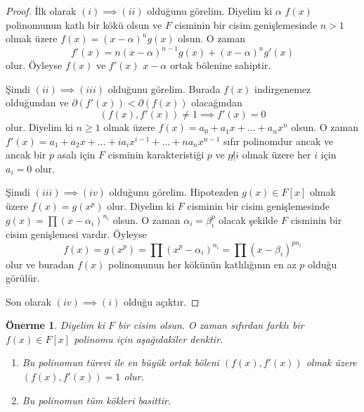 \documentclass[draft]{article}
\newtheorem{prop}[thm]{Önerme}
\theoremstyle{definition}
\theoremstyle{remark}
\begin{document}
    	    \begin{proof}
    	        İlk olarak $(i) \implies (ii)$ olduğunu görelim. Diyelim ki $\alpha$ $f(x)$ polinomunun katlı bir kökü olsun ve $F$ cisminin bir cisim genişlemesinde $n > 1$ olmak üzere $f(x) = (x - \alpha)^ng(x)$ olsun. O zaman
    	        \begin{equation*}
    	            f'(x) = n(x - \alpha)^{n - 1}g(x) + (x - \alpha)^ng'(x)
    	        \end{equation*}
    	        olur. Öyleyse $f(x)$ ve $f'(x)$ $x - \alpha$ ortak bölenine sahiptir.\par
    	        Şimdi $(ii) \implies (iii)$ olduğunu görelim. Burada $f(x)$ indirgenemez olduğundan ve $\partial(f'(x)) < \partial(f(x))$ olacağından
    	        \begin{equation*}
    	            (f(x), f'(x)) \neq 1 \implies f'(x) = 0
    	        \end{equation*}
    	        olur. Diyelim ki $n \geq 1$ olmak üzere $f(x) = a_0 + a_1x + \dots + a_nx^n$ olsun. O zaman $f'(x) = a_1 + a_2x + \dots + ia_ix^{i - 1} + \dots + na_nx^{n - 1}$ sıfır polinomdur ancak ve ancak bir $p$ asalı için $F$ cisminin karakteristiği $p$ ve $p \not| i$ olmak üzere her $i$ için $a_i = 0$ olur.\par
    	        Şimdi $(iii) \implies (iv)$ olduğunu görelim. Hipotezden $g(x) \in F[x]$ olmak üzere $f(x) = g(x^p)$ olur. Diyelim ki $F$ cisminin bir cisim genişlemesinde $g(x) = \prod{(x - \alpha_i)^{n_i}}$ olsun. O zaman $\alpha_i = \beta_i^p$ olacak şekilde $F$ cisminin bir cisim genişlemesi vardır. Öyleyse
    	        \begin{equation*}
    	            f(x) = g(x^p) = \prod{(x^p - \alpha_i)^{n_i}} = \prod{(x - \beta_i)^{pn_i}}
    	        \end{equation*}
    	        olur ve buradan $f(x)$ polinomunun her kökünün katlılığının en az $p$ olduğu görülür.\par
    	        Son olarak $(iv) \implies (i)$ olduğu açıktır.
    	    \end{proof}
    	    
    	    \begin{prop}
    	        Diyelim ki $F$ bir cisim olsun. O zaman sıfırdan farklı bir $f(x) \in F[x]$ polinomu için aşağıdakiler denktir.
    	        \begin{enumerate}
				\renewcommand{\labelenumi}{(\roman{enumi})}
				    \item Bu polinomun türevi ile en büyük ortak böleni $(f(x), f'(x))$ olmak üzere $(f(x), f'(x)) = 1$ olur.
				    \item Bu polinomun tüm kökleri basittir.
				\end{enumerate}
    	    \end{prop}
    	    
\end{document}
